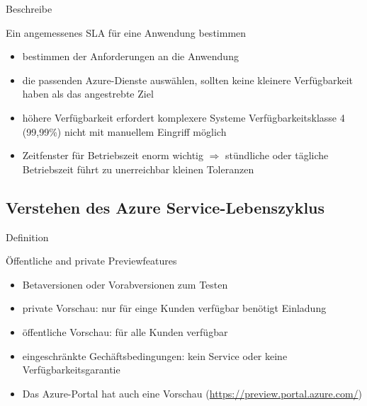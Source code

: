 \documentclass{scrartcl}
\newenvironment{flashcard}[2][]{%
    #1
    \vfill
    \centerline{\Large{#2}}
    \vfill
\newpage
}
{\newpage}
\newcommand{\subsectioncard}[1]{
    \vspace*{\stretch{1}}
    \subsection{#1}
    \vspace*{\stretch{1}}
    \pagebreak
}
\begin{document}
    \begin{flashcard}[Beschreibe]{Ein angemessenes SLA für eine Anwendung bestimmen}
            \begin{itemize}
                \item bestimmen der Anforderungen an die Anwendung
                \item die passenden Azure-Dienste auswählen, sollten keine kleinere Verfügbarkeit haben als das angestrebte Ziel
                \item höhere Verfügbarkeit erfordert komplexere Systeme\newline
                Verfügbarkeitsklasse 4 (99,99\%) nicht mit manuellem Eingriff möglich
                \item Zeitfenster für Betriebszeit enorm wichtig\newline
                $\Rightarrow$ stündliche oder tägliche Betriebszeit führt zu unerreichbar kleinen Toleranzen
            \end{itemize}
    \end{flashcard}

    \subsectioncard{Verstehen des Azure Service-Lebenszyklus}

    \begin{flashcard}[Definition]{Öffentliche and private Previewfeatures}
        \begin{itemize}
            \item Betaversionen oder Vorabversionen zum Testen
            \item private Vorschau: nur für einge Kunden verfügbar\newline
            benötigt Einladung
            \item öffentliche Vorschau: für alle Kunden verfügbar
            \item eingeschränkte Gechäftsbedingungen: kein Service oder keine Verfügbarkeitsgarantie
            \item Das Azure-Portal hat auch eine Vorschau\newline
            (\href{https://preview.portal.azure.com/}{https://preview.portal.azure.com/})
        \end{itemize}
    \end{flashcard}
\end{document}
